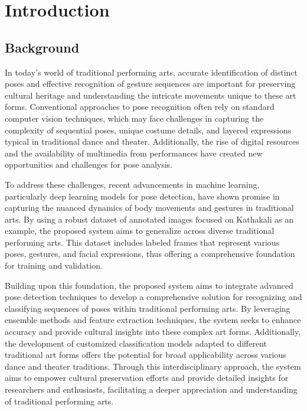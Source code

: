 \chapter{Introduction}

\section{Background}

In today’s world of traditional performing arts, accurate identification of distinct poses and effective recognition of gesture sequences are important for preserving cultural heritage and understanding the intricate movements unique to these art forms. Conventional approaches to pose recognition often rely on standard computer vision techniques, which may face challenges in capturing the complexity of sequential poses, unique costume details, and layered expressions typical in traditional dance and theater. Additionally, the rise of digital resources and the availability of multimedia from performances have created new opportunities and challenges for pose analysis.

To address these challenges, recent advancements in machine learning, particularly deep learning models for pose detection, have shown promise in capturing the nuanced dynamics of body movements and gestures in traditional arts. By using a robust dataset of annotated images focused on Kathakali as an example, the proposed system aims to generalize across diverse traditional performing arts. This dataset includes labeled frames that represent various poses, gestures, and facial expressions, thus offering a comprehensive foundation for training and validation.

Building upon this foundation, the proposed system aims to integrate advanced pose detection techniques to develop a comprehensive solution for recognizing and classifying sequences of poses within traditional performing arts. By leveraging ensemble methods and feature extraction techniques, the system seeks to enhance accuracy and provide cultural insights into these complex art forms. Additionally, the development of customized classification models adapted to different traditional art forms offers the potential for broad applicability across various dance and theater traditions. Through this interdisciplinary approach, the system aims to empower cultural preservation efforts and provide detailed insights for researchers and enthusiasts, facilitating a deeper appreciation and understanding of traditional performing arts.

